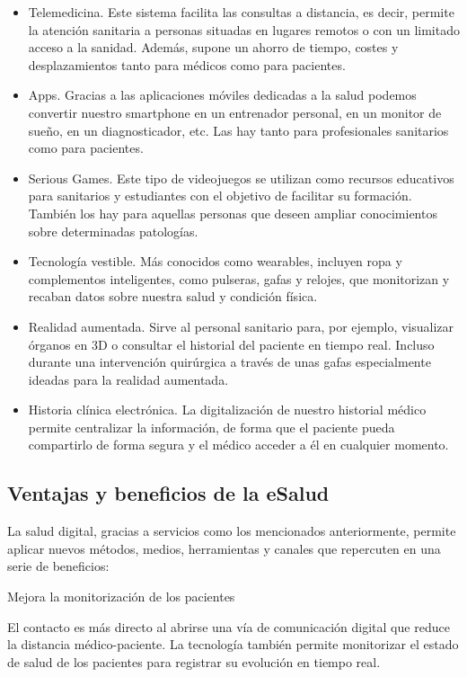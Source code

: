 \documentclass[12pt]{article}
\begin{document}
\begin{itemize}
    \item Telemedicina. Este sistema facilita las consultas a distancia, es decir, permite la atención sanitaria a personas situadas en lugares remotos o con un limitado acceso a la sanidad. Además, supone un ahorro de tiempo, costes y desplazamientos tanto para médicos como para pacientes.
    \item Apps. Gracias a las aplicaciones móviles dedicadas a la salud podemos convertir nuestro smartphone en un entrenador personal, en un monitor de sueño, en un diagnosticador, etc. Las hay tanto para profesionales sanitarios como para pacientes.
    \item Serious Games. Este tipo de videojuegos se utilizan como recursos educativos para sanitarios y estudiantes con el objetivo de facilitar su formación. También los hay para aquellas personas que deseen ampliar conocimientos sobre determinadas patologías.
    \item Tecnología vestible. Más conocidos como wearables, incluyen ropa y complementos inteligentes, como pulseras, gafas y relojes, que monitorizan y recaban datos sobre nuestra salud y condición física.
    \item Realidad aumentada. Sirve al personal sanitario para, por ejemplo, visualizar órganos en 3D o consultar el historial del paciente en tiempo real. Incluso durante una intervención quirúrgica a través de unas gafas especialmente ideadas para la realidad aumentada.
    \item Historia clínica electrónica. La digitalización de nuestro historial médico permite centralizar la información, de forma que el paciente pueda compartirlo de forma segura y el médico acceder a él en cualquier momento.
\end{itemize}

\subsection*{Ventajas y beneficios de la eSalud}
La salud digital, gracias a servicios como los mencionados anteriormente, permite aplicar nuevos métodos, medios, herramientas y canales que repercuten en una serie de beneficios:

Mejora la monitorización de los pacientes

El contacto es más directo al abrirse una vía de comunicación digital que reduce la distancia médico-paciente. La tecnología también permite monitorizar el estado de salud de los pacientes para registrar su evolución en tiempo real.
\end{document}
